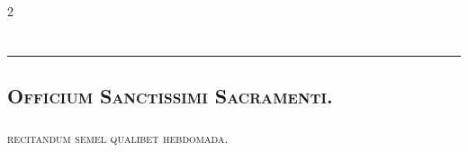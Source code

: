 \documentclass[9pt,twoside]{extarticle}
\begin{document}
\begin{multicols}{2}
%
%
%
\clearpage
{}
\renewcommand{\thepage}{[\arabic{page}]*}

\section*{\center \textsc{}}
\subsection*{\center \textsc{}}
\subsubsection*{\center {}}
\begin{center}\textcolor{red}{\rule{\linewidth}{0.5pt}} \end{center}

\subsection*{\center \textsc{Officium Sanctissimi Sacramenti.}}
\subsubsection*{\center {}}
\begin{center}\textsc{recitandum semel qualibet hebdomada.}\end{center}

\end{multicols}
\end{document}
